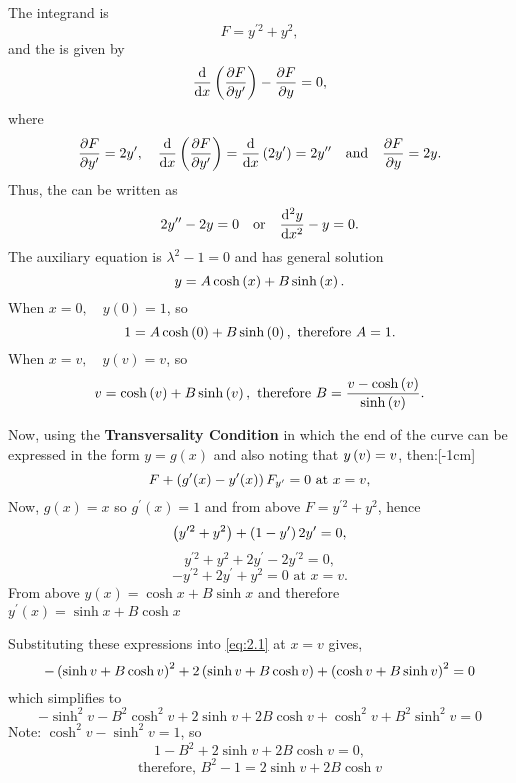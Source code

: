 The integrand is 
\[
	F = y^{\prime2} + y^2,
\]
and the \el is given by
\[
	\frac{\mathrm{d}}{\mathrm{d}x}\left(\frac{\partial F}{\partial y^\prime}\right)-\frac{\partial F}{\partial y} = 0,
\]
where
\[
	\frac{\partial F}{\partial y^\prime} = 2y^\prime, \quad \frac{\mathrm{d}}{\mathrm{d}x}\left(\frac{\partial F}{\partial y^\prime}\right)=\frac{\mathrm{d}}{\mathrm{d}x}\left(2y^\prime\right) = 2y^{\prime\prime}\quad\text{and}\quad \frac{\partial F}{\partial y}=2y.
\]
Thus, the \el can be written as
\[
	2y^{\prime\prime} - 2y = 0\quad\text{or}\quad \frac{\mathrm{d}^2y}{\mathrm{d}x^2} - y = 0.
\]
The auxiliary equation is $\lambda^2 - 1 = 0$ and has general solution
\[
	y = A \cosh\left(x\right) +  B \sinh\left(x\right).
\]
When $x=0,\quad y(0)=1$, so
\[
	1 = A \cosh\left(0\right) +  B \sinh\left(0\right),\text{ therefore } A=1.
\]
When $x=v,\quad y(v)=v$, so
\[
	v = \cosh\left(v\right) +  B \sinh\left(v\right),\text{ therefore } B=\frac{v-\cosh\left(v\right)}{\sinh\left(v\right)}.
\]

Now, using the \textbf{Transversality Condition} in which the end of the curve can be expressed in the form $y=g(x)$ and also noting that $y\left(v\right)=v$, then:[-1cm]
\[
	F + \left(g^\prime(x) - y^\prime(x)\right) F_{y^\prime} = 0 \text{ at } x=v,
\]
Now, $g(x) = x$ so $g^\prime(x) = 1$ and from above $F = y^{\prime2} + y^2$, hence
\[
	\left(y^{\prime2} + y^2 \right) + \left(1 - y^\prime\right)2y^\prime = 0,
\]
\[
	y^{\prime2} + y^2 + 2y^\prime - 2y^{\prime 2} = 0,
\]
\begin{equation}
\label{eq:2.1}
	-y^{\prime2} + 2y^\prime + y^2 = 0  \text{ at } x=v.
\end{equation}
From above $y(x) = \cosh x + B\sinh x$ and therefore $y^\prime(x) = \sinh x + B \cosh x$

Substituting these expressions into \eqref{eq:2.1} at $x=v$ gives,
\[
	-\left(\sinh v + B \cosh v\right)^2 + 2\left(\sinh v + B \cosh v\right) + \left(\cosh v + B\sinh v\right)^2 = 0
\]
which simplifies to
\[
	-\sinh^2 v -  B^2 \cosh^2 v + 2\sinh v + 2B\cosh v + \cosh^2 v + B^2\sinh^2 v = 0
\]
Note: $\cosh^2 v - \sinh^2 v = 1$, so
\[
	1 - B^2 + 2\sinh v + 2B\cosh v = 0,
\]
\[
	\boxed{\text{therefore, } B^2 - 1 = 2\sinh v + 2 B\cosh v}
\]
